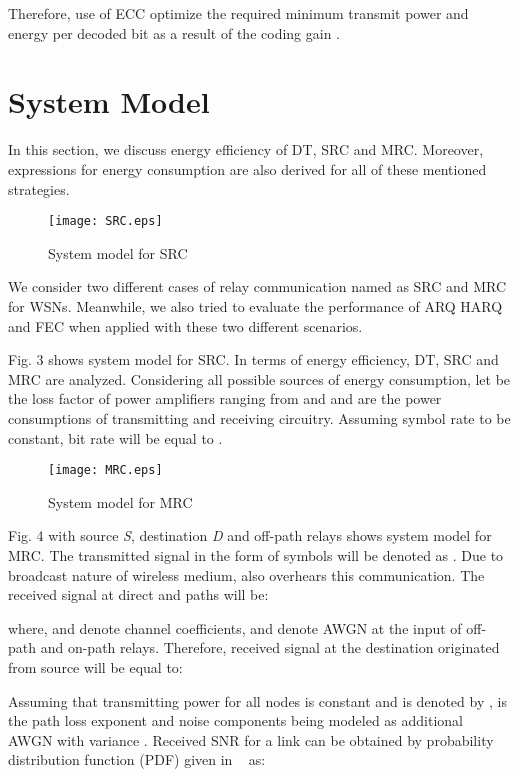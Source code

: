 \documentclass{sig-alternate}
\begin{document}
\normalsize

Therefore, use of ECC optimize the required minimum transmit power and energy per decoded bit as a result of the coding gain .

\section{System Model}
In this section, we discuss energy efficiency of DT, SRC and MRC. Moreover, expressions for energy consumption are also derived for all of these mentioned strategies.

\begin{figure}[!ht]
\centering
{\texttt{[image: SRC.eps]}}
 \vspace{-.4cm}
\caption{System model for SRC}
\end{figure}

We consider two different cases of relay communication named as SRC and MRC for WSNs. Meanwhile, we also tried to evaluate the performance of ARQ HARQ and FEC when applied with these two different scenarios.

Fig. 3 shows system model for SRC. In terms of energy efficiency, DT, SRC and MRC are analyzed. Considering all possible sources of energy consumption, let  be the loss factor of power amplifiers ranging from  and  and  are the power consumptions of transmitting and receiving circuitry. Assuming symbol rate  to be constant, bit rate will be equal to  .

\begin{figure}[!ht]
\centering
{\texttt{[image: MRC.eps]}}
 \vspace{-.4cm}
\caption{System model for MRC}
\end{figure}

Fig. 4 with source \textit{S}, destination \textit{D} and off-path relays  shows system model for MRC. The transmitted signal in the form of symbols will be denoted as . Due to broadcast nature of wireless medium,  also overhears this communication. The received signal at direct and  paths will be:







where,  and  denote channel coefficients,  and  denote AWGN at the input of off-path and on-path relays. Therefore, received signal at the destination originated from source will be equal to:



Assuming that transmitting power for all nodes is constant and is denoted by ,  is the path loss exponent and noise components being modeled as additional AWGN with variance . Received SNR  for a link can be obtained by probability distribution function (PDF) given in ~\cite{6} as:
\end{document}
